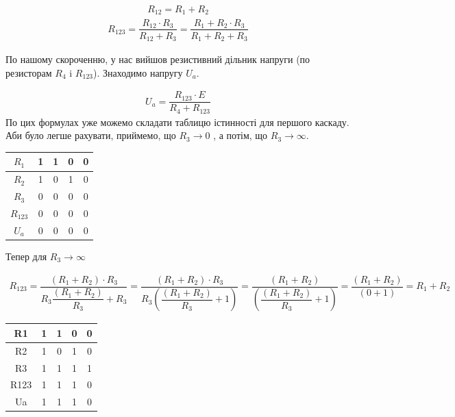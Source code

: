 \documentclass[a4paper,14pt]{extreport}
\begin{document}
	\begin{align}
	  R_{12} = R_1 + R_2
	\end{align}
	\begin{align}
	  R_{123} = \dfrac{R_{12} \cdot R_3}{R_{12} + R_3} = \dfrac{R_{1}+R_{2} \cdot R_3}{R_{1}+R_{2} + R_3}
	\end{align}

	По нашому скороченню, у нас вийшов резистивний дільник напруги (по резисторам $R_{4}$ i $R_{123}$). Знаходимо напругу $U_a$.

	\begin{align}
	  U_a = \dfrac{R_{123} \cdot E}{R_{4} + R_{123}}
	\end{align}
	По цих формулах уже можемо складати таблицю істинності для першого каскаду. Аби було легше рахувати, приймемо, що $R_{3} \rightarrow 0$ , а потім, що $R_{3} \rightarrow \infty$.

	\begin{table}[h]
	  \begin{center}
	    \begin{tabular}{|c|c|c|c|c|}
	    \hline
	    $R_1 $  & 1 & 1 & 0 & 0 \\ \hline
	    $R_2 $  & 1 & 0 & 1 & 0 \\ \hline
	    $R_3 $  & 0 & 0 & 0 & 0 \\ \hline
	    $R_{123} $& 0 & 0 & 0 & 0 \\ \hline
	    $U_a  $ & 0 & 0 & 0 & 0 \\ \hline
	    \end{tabular}
	  \end{center}
	\end{table}
	Тепер для $R_{3} \rightarrow \infty$

	\begin{align}
	R_{123}=\dfrac{\left(R_{1}+R_{2}\right) \cdot R_{3}}{R_{3} \dfrac{\left(R_{1}+R_{2}\right)}{R_{3}}+R_{3}}=\dfrac{\left(R_{1}+R_{2}\right) \cdot R_{3}}{R_{3}\left(\dfrac{\left(R_{1}+R_{2}\right)}{R_{3}}+1\right)}=
	 \dfrac{\left(R_{1}+R_{2}\right)}{\left(\dfrac{\left(R_{1}+R_{2}\right)}{R_{3}}+1\right)}=\dfrac{\left(R_{1}+R_{2}\right)}{(0+1)}=R_{1}+R_{2}
	\end{align}



	\begin{table}[h]
	  \begin{center}
	    \begin{tabular}{|c|c|c|c|c|}
	    \hline
	    R1   & 1 & 1 & 0 & 0 \\ \hline
	    R2   & 1 & 0 & 1 & 0 \\ \hline
	    R3   & 1 & 1 & 1 & 1 \\ \hline
	    R123 & 1 & 1 & 1 & 0 \\ \hline
	    Ua   & 1 & 1 & 1 & 0 \\ \hline
	    \end{tabular}
	  \end{center}
	\end{table}
\end{document}
